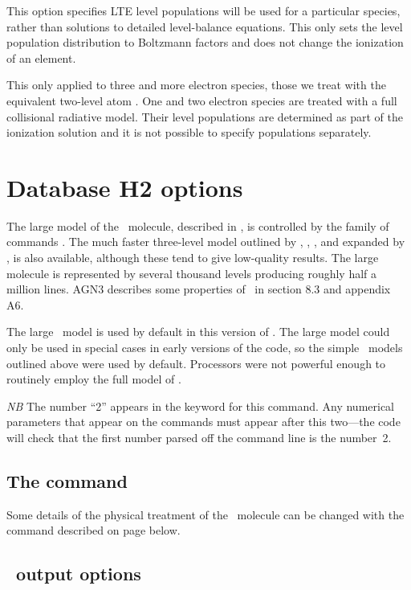 This option specifies LTE level populations will be used for 
a particular species, rather than solutions to detailed level-balance equations.
This only sets the level population distribution to Boltzmann factors
and does not change the ionization of an element.

This only applied to three and more electron species, those we treat with the
equivalent two-level atom \citep{CloudyRevista2017}.
One and two electron species are treated with a full collisional radiative model.
Their level populations are determined as part of the ionization solution and
it is not possible to specify populations separately.

\section{Database H2 options}
\label{sec:AtomH2}

The large model of the \htwo\ molecule, described in \citet{Shaw2005},
is controlled by the family of 
commands .
The much
faster three-level model outlined by \citet{Tielens1985a},
\citet{Burton1990}, \citet{Draine1996},
and expanded
by \citet{Elwert2006}, is also available, although these tend to give low-quality results.
The large molecule is
represented by several thousand levels producing roughly half a million
lines.
AGN3 describes some properties of \htwo\ in section 8.3
and appendix A6.

The large \htwo\ model is used by default in this version of \Cloudy. 
The large model could only be used in special cases in early versions 
of the code, so the simple \htwo\ models outlined above were used by default. 
Processors were not powerful enough to routinely employ the full
model of \htwo.

\emph{NB}  The number ``2'' appears in the keyword for this command.
Any
numerical parameters that appear on the 
commands must appear after
this two---the code will check that the first number
parsed off the command line is the number~2.

\subsection{The  command}

Some details of the physical treatment of the \htwo\ molecule can be
changed with the  command described on page
\pageref{sec:SetH2} below.

\subsection{\htwo\ output options}

